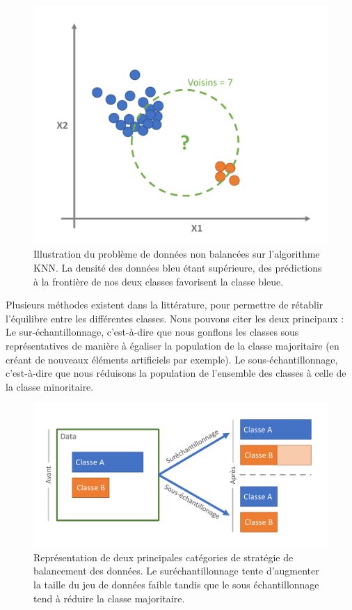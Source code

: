 \begin{figure}[H]
    \centering
    \includegraphics[width=\linewidth]{contents/chapter_3/resources/Unbalanced.pdf}
    \caption{Illustration du problème de données non balancées sur l’algorithme KNN. La densité des données bleu étant supérieure, des prédictions à la frontière de nos deux classes favorisent la classe bleue.}
    \label{fig:chapter_3:Unbalanced}
\end{figure}

Plusieurs méthodes existent dans la littérature, pour permettre de rétablir l’équilibre entre les différentes classes. Nous pouvons citer les deux principaux :
	Le sur-échantillonnage, c’est-à-dire que nous gonflons les classes sous représentatives de manière à égaliser la population de la classe majoritaire (en créant de nouveaux éléments artificiels par exemple).
	Le sous-échantillonnage, c’est-à-dire que nous réduisons la population de l’ensemble des classes à celle de la classe minoritaire.
 
\begin{figure}[H]
    \centering
    \includegraphics[width=\linewidth]{contents/chapter_3/resources/BalancementStrategies.pdf}
    \caption{Représentation de deux principales catégories de stratégie de balancement des données. Le suréchantillonnage tente d’augmenter la taille du jeu de données faible tandis que le sous échantillonnage tend à réduire la classe majoritaire. }
    \label{fig:chapter_3:Balancement}
\end{figure}

